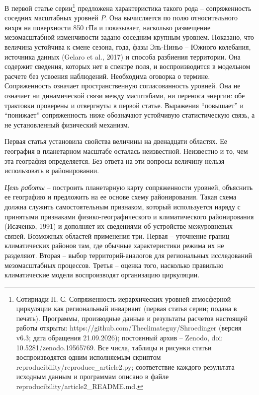 \documentclass[12pt,a4paper]{article}
\begin{document}
В первой статье серии\footnote{Сотириади Н. С. Сопряженность иерархических уровней атмосферной циркуляции как региональный инвариант (первая статья серии; подана в печать). Программы, производные данные и результаты расчетов настоящей работы открыты: https://github.com/Theclimateguy/Shroedinger (версия v6.3; дата обращения 21.09.2026); постоянный архив -- Zenodo, doi: 10.5281/zenodo.19565769. Все числа, таблицы и рисунки статьи воспроизводятся одним исполняемым скриптом reproducibility/reproduce\_article2.py; соответствие каждого результата исходным данным и программам описано в файле reproducibility/article2\_README.md.} предложена характеристика такого рода -- сопряженность соседних масштабных уровней $P$. Она вычисляется по полю относительного вихря на поверхности 850 гПа и показывает, насколько размещение мезомасштабной изменчивости задано соседним крупным уровнем. Показано, что величина устойчива к смене сезона, года, фазы Эль-Ниньо -- Южного колебания, источника данных (Gelaro et al., 2017) и способа разбиения территории. Она содержит сведения, которых нет в спектре поля, и воспроизводится в модельном расчете без усвоения наблюдений. Необходима оговорка о термине. Сопряженность означает пространственную согласованность уровней. Она не означает ни динамической связи между масштабами, ни переноса энергии: обе трактовки проверены и отвергнуты в первой статье. Выражения “повышает” и “понижает” сопряженность ниже обозначают устойчивую статистическую связь, а не установленный физический механизм.

Первая статья установила свойства величины на двенадцати областях. Ее география в планетарном масштабе осталась неизвестной. Неизвестно и то, чем эта география определяется. Без ответа на эти вопросы величину нельзя использовать в районировании.

\emph{Цель работы} -- построить планетарную карту сопряженности уровней, объяснить ее географию и предложить на ее основе схему районирования. Такая схема должна служить самостоятельным признаком, который используется наряду с принятыми признаками физико-географического и климатического районирования (Исаченко, 1991) и дополняет их сведениями об устройстве межуровневых связей. Возможных областей применения три. Первая -- уточнение границ климатических районов там, где обычные характеристики режима их не разделяют. Вторая -- выбор территорий-аналогов для региональных исследований мезомасштабных процессов. Третья -- оценка того, насколько правильно климатические модели воспроизводят организацию циркуляции.
\end{document}
